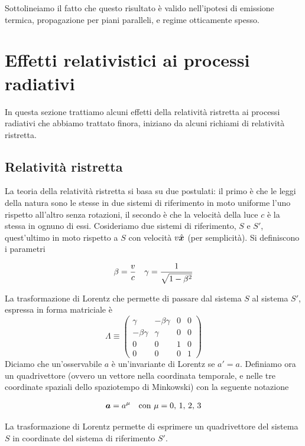 Sottolineiamo il fatto che questo risultato è valido nell'ipotesi di emissione termica, propagazione per piani paralleli, e regime otticamente spesso.

\section{Effetti relativistici ai processi radiativi}
In questa sezione trattiamo alcuni effetti della relatività ristretta ai processi radiativi che abbiamo trattato finora, iniziano da alcuni richiami di relatività ristretta.
\subsection{Relatività ristretta}
La teoria della relatività ristretta si basa su due postulati: il primo è che le leggi della natura sono le stesse in due sistemi di riferimento in moto uniforme l'uno rispetto all'altro senza rotazioni, il secondo è che la velocità della luce $c$ è la stessa in ognuno di essi. Cosideriamo due sistemi di riferimento, $S$ e $S'$, quest'ultimo in moto rispetto a $S$ con velocità $v\vers{x}$ (per semplicità). Si definiscono i parametri
\begin{EQ}
\begin{align}
&\beta = \dfrac{v}{c} 
&\gamma = \dfrac{1}{\sqrt{1-\beta^2}}
\end{align}
\end{EQ}
La trasformazione di Lorentz che permette di passare dal sistema $S$ al sistema $S'$, espressa in forma matriciale è 
\begin{equation}
\Lambda \equiv
\begin{pmatrix}
\gamma & -\beta\gamma & 0 & 0 \\[4pt]
-\beta\gamma & \gamma & 0 & 0 \\[4pt]
0 & 0 & 1 & 0 \\[4pt]
0 & 0 & 0 & 1
\end{pmatrix} \label{eq:Relatività1}
\end{equation}
Diciamo che un'osservabile $a$ è un'invariante di Lorentz se $a'=a$. Definiamo ora un quadrivettore (ovvero un vettore nella coordinata temporale, e nelle tre coordinate spaziali dello spaziotempo di Minkowski) con la seguente notazione
\begin{EQ}
\begin{align}
&\V{a} = a^\mu 
&\mathrm{con} \,\, \mu = 0, \, 1, \, 2, \, 3
\end{align}
\end{EQ}
La trasformazione di Lorentz permette di esprimere un quadrivettore del sistema $S$ in coordinate del sistema di riferimento $S'$. 

